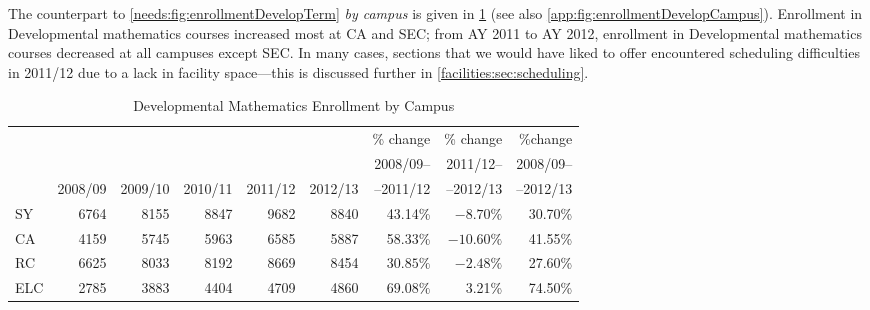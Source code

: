 The counterpart
to \cref{needs:fig:enrollmentDevelopTerm} \emph{by campus} is given in \cref{needs:tab:enrollmentDevelp}
(see also \vref{app:fig:enrollmentDevelopCampus}).
Enrollment in Developmental mathematics courses increased most
at CA and SEC; from AY 2011 to AY 2012, enrollment in Developmental mathematics courses
decreased at all campuses except SEC. In many cases,
sections that we would have liked to offer encountered scheduling difficulties in 2011/12 due to a lack 
in facility space---this is discussed further in  \vref{facilities:sec:scheduling}.

\begin{table}[!htb]
	\begin{widepage}
	\centering
	\caption{Developmental Mathematics Enrollment by Campus}
	\label{needs:tab:enrollmentDevelp}
	\begin{tabularx}{\linewidth}{X*{7}rr}
		\toprule
		    &         &         &         &         &         & \% change  & \% change  & \%change  \\
		    &         &         &         &         &         & 2008/09-- & 2011/12--  & 2008/09-- \\
		    & 2008/09 & 2009/10 & 2010/11 & 2011/12 & 2012/13 & --2011/12  & --2012/13  & --2012/13 \\
		\midrule
		SY  & 6764    & 8155    & 8847    & 9682    & 8840    & 43.14\%    & $-8.70\%$  & 30.70\%   \\
		CA  & 4159    & 5745    & 5963    & 6585    & 5887    & 58.33\%    & $-10.60\%$ & 41.55\%   \\
		RC  & 6625    & 8033    & 8192    & 8669    & 8454    & $30.85\%$  & $-2.48\%$  & 27.60\%   \\
		ELC & 2785    & 3883    & 4404    & 4709    & 4860    & $69.08\%$  & 3.21\%     & 74.50\%   \\
		\bottomrule
	\end{tabularx}
	\end{widepage}
\end{table}

